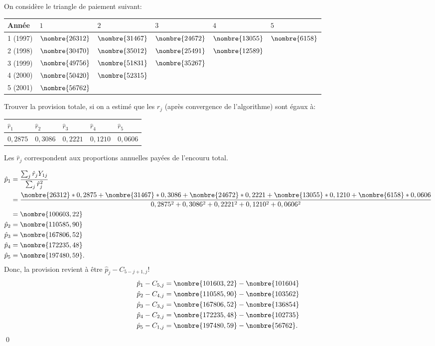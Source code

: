\begin{exemple}
  On considère le triangle de paiement suivant:
  \begin{center}
    \begin{tabular}{|l|l l l l l|}\hline
      Année & $1$ & $2$ & $3$ & $4$ & $5$  \\ \hline
      1 (1997)& $\nombre{26312}$ & $\nombre{31467}$ & $\nombre{24672}$ & $\nombre{13055}$ & $\nombre{6158}$ \\
      2 (1998)& $\nombre{30470}$ & $\nombre{35012}$ & $\nombre{25491}$ & $\nombre{12589}$ &  \\
      3 (1999)& $\nombre{49756}$ & $\nombre{51831}$ & $\nombre{35267}$ &&\\
      4 (2000)& $\nombre{50420}$ & $\nombre{52315}$ & &&\\
      5 (2001)& $\nombre{56762}$ &  &&&\\ \hline
    \end{tabular}
  \end{center}
  Trouver la provision totale, si on a estimé que les $\hat{r}_{j}$
  (après convergence de l'algorithme) sont égaux à:
  \begin{center}
    \begin{tabular}{|l l l l l|}\hline
      $\hat{r}_1$ & $\hat{r}_2$ & $\hat{r}_3$ & $\hat{r}_4$ & $\hat{r}_5$ \\ \hline
      $0,2875$ &$0,3086$ &$0,2221$ &$0,1210$ &$0,0606$ \\ \hline
    \end{tabular}
  \end{center}
  Les $\hat{r}_{j}$ correspondent aux proportions annuelles payées de
  l'encouru total.

  \begin{align*}
    \hat{p}_{1} &= \frac{\sum_{j} \hat{r}_{j} Y_{1 j}}{\sum_{j} \hat{r}_{j}^2 }\\
                &= \frac{\nombre{26312}*0,2875 +\nombre{31467}*0,3086 + \nombre{24672}*0,2221 + \nombre{13055}*0,1210 + \nombre{6158}*0,0606}
                  {0,2875^2 + 0,3086^2 + 0,2221^2 + 0,1210^2 + 0,0606^2} \\
                &= \nombre{100603,22} \\
    \hat{p}_{2} &= \nombre{110585,90} \\
    \hat{p}_{3} &= \nombre{167806,52} \\
    \hat{p}_{4} &= \nombre{172235,48} \\
    \hat{p}_{5} &= \nombre{197480,59}.
  \end{align*}
  Donc, la provision revient à être $\hat{p}_j - C_{5-j+1,j}$!
  \begin{align*}
    \hat{p}_1 - C_{5,j} &= \nombre{101603,22} - \nombre{101604} \\
    \hat{p}_2 - C_{4,j} &= \nombre{110585,90} - \nombre{103562} \\
    \hat{p}_3 - C_{3,j} &= \nombre{167806,52} - \nombre{136854} \\
    \hat{p}_4 - C_{2,j} &= \nombre{172235,48} - \nombre{102735} \\
    \hat{p}_5 - C_{1,j} &= \nombre{197480,59} - \nombre{56762}.
  \end{align*}
  \qed
\end{exemple}


